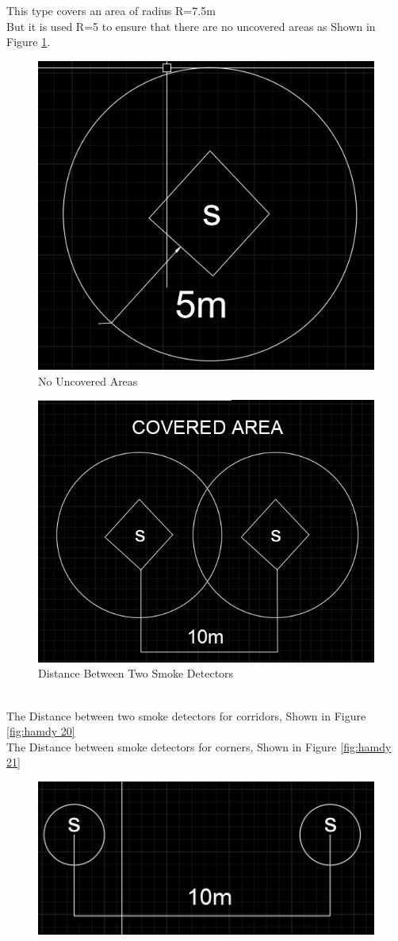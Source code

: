 \documentclass[12pt,fleqn]{book} %
\begin{document}
\begin{enumerate}
\begin{itemize}
    This type covers an area of radius R=7.5m \\
    But it is used R=5 to ensure that there are no uncovered areas as Shown in Figure \ref{fig:hamdy 18}.\\
\begin{figure}[!h]
    \centering
    \includegraphics[width=0.5\linewidth]{hamdy 18.png}
    \caption{No Uncovered Areas}
    \label{fig:hamdy 18}
\end{figure}
\begin{figure}[!h]
    \centering
    \includegraphics[width=0.5\linewidth]{hamdy 19.png}
    \caption{Distance Between Two Smoke Detectors}
    \label{fig:hamdy 19}
\end{figure} 
\\ The Distance between two smoke detectors for corridors, Shown in Figure \ref{fig:hamdy 20}
\\ The Distance between smoke detectors for corners, Shown in Figure \ref{fig:hamdy 21}
\begin{figure}[!h]
    \centering
    \includegraphics[width=0.8\linewidth]{hamdy 20.png}

\end{figure}
\end{itemize}
\end{enumerate}
\end{document}
